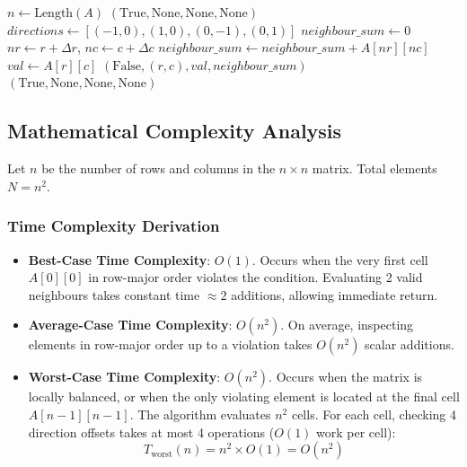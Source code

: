 \begin{algorithm}[H]
\caption{Locally Balanced Matrix Verification}
\begin{algorithmic}[1]
    \State $n \gets \text{Length}(A)$
     \Return $(\text{True}, \text{None}, \text{None}, \text{None})$ \EndIf
    \State $directions \gets [(-1, 0), (1, 0), (0, -1), (0, 1)]$
     
            \State $neighbour\_sum \gets 0$
                \State $nr \gets r + \Delta r$, $nc \gets c + \Delta c$
                    \State $neighbour\_sum \gets neighbour\_sum + A[nr][nc]$
                \EndIf
            \EndFor
            \State $val \gets A[r][c]$
                \State \Return $(\text{False}, (r, c), val, neighbour\_sum)$ 
            \EndIf
        \EndFor
    \EndFor
    \State \Return $(\text{True}, \text{None}, \text{None}, \text{None})$
\EndFunction
\end{algorithmic}
\end{algorithm}

\subsection{Mathematical Complexity Analysis}
Let $n$ be the number of rows and columns in the $n \times n$ matrix. Total elements $N = n^2$.

\subsubsection{Time Complexity Derivation}
\begin{itemize}
    \item \textbf{Best-Case Time Complexity}: $O(1)$.
    Occurs when the very first cell $A[0][0]$ in row-major order violates the condition. Evaluating 2 valid neighbours takes constant time $\approx 2$ additions, allowing immediate return.
    
    \item \textbf{Average-Case Time Complexity}: $O(n^2)$.
    On average, inspecting elements in row-major order up to a violation takes $O(n^2)$ scalar additions.
    
    \item \textbf{Worst-Case Time Complexity}: $O(n^2)$.
    Occurs when the matrix is locally balanced, or when the only violating element is located at the final cell $A[n-1][n-1]$. The algorithm evaluates $n^2$ cells. For each cell, checking 4 direction offsets takes at most 4 operations ($O(1)$ work per cell):
    \[
    T_{\text{worst}}(n) = n^2 \times O(1) = O(n^2)
    \]
\end{itemize}

